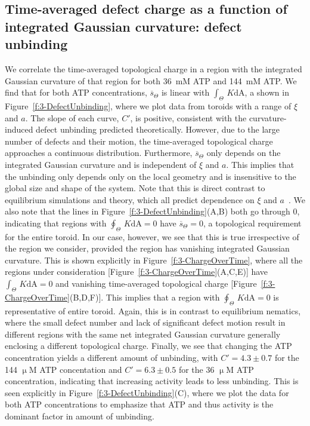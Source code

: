 \subsection{Time-averaged defect charge as a function of integrated Gaussian curvature: defect unbinding}
We correlate the time-averaged topological charge in a region with the integrated Gaussian curvature of that region for both 36~mM ATP and 144~mM ATP.
We find that for both ATP concentrations, $\overbar{s}_{\Theta}$ is linear with $\int_{\Theta}\,K\textrm{dA}$, a shown in Figure~\ref{f:3-DefectUnbinding}, where we plot data from toroids with a range of $\xi$ and $a$.
The slope of each curve, $C'$, is positive, consistent with the curvature-induced defect unbinding predicted theoretically.
However, due to the large number of defects and their motion, the time-averaged topological charge approaches a continuous distribution.
Furthermore, $\overbar{s}_{\Theta}$ only depends on the integrated Gaussian curvature and is independent of $\xi$ and $a$.
This implies that the unbinding only depends only on the local geometry and is insensitive to the  global size and shape of the system.
Note that this is direct contrast to equilibrium simulations and theory, which all predict dependence on $\xi$ and $a$~\cite{RN36,RN19,RN22,RN20,RN78}.
We also note that the lines in Figure~\ref{f:3-DefectUnbinding}(A,B) both go through 0, indicating that regions with $\oint_{\Theta}\,K\textrm{dA} = 0$ have $\overbar{s}_{\Theta} = 0$, a topological requirement for the entire toroid.
In our case, however, we see that this is true irrespective of the region we consider, provided the region has vanishing integrated Gaussian curvature.
This is shown explicitly in Figure~\ref{f:3-ChargeOverTime}, where all the regions under consideration [Figure~\ref{f:3-ChargeOverTime}(A,C,E)] have $\int_{\Theta}\,K\textrm{dA} = 0$ and vanishing time-averaged topological charge [Figure~\ref{f:3-ChargeOverTime}(B,D,F)].
This implies that a region with $\oint_{\Theta}\,K\textrm{dA} = 0$ is representative of entire toroid.
Again, this is in contrast to equilibrium nematics, where the small defect number and lack of significant defect motion result in different regions with the same net integrated Gaussian curvature generally enclosing a different topological charge.
Finally, we see that changing the ATP concentration yields a different amount of unbinding, with $C' = 4.3 \pm 0.7$ for the 144 $\upmu$M ATP concentation and $C' = 6.3 \pm 0.5$ for the 36 $\upmu$M ATP concentration, indicating that increasing activity leads to less unbinding.
This is seen explicitly in Figure~\ref{f:3-DefectUnbinding}(C), where we plot the data for both ATP concentrations to emphasize that ATP and thus activity is the dominant factor in amount of unbinding.
